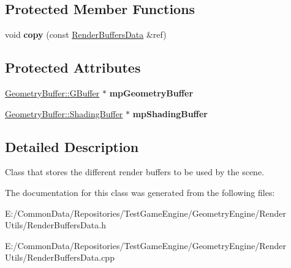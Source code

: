 \subsection*{Protected Member Functions}
\begin{DoxyCompactItemize}
\item 
\mbox{\label{class_geometry_engine_1_1_geometry_render_data_1_1_render_buffers_data_a2374fe2ef3836cf3820244132f9ddd2e}} 
void {\bfseries copy} (const \mbox{\hyperlink{class_geometry_engine_1_1_geometry_render_data_1_1_render_buffers_data}{Render\+Buffers\+Data}} \&ref)
\end{DoxyCompactItemize}
\subsection*{Protected Attributes}
\begin{DoxyCompactItemize}
\item 
\mbox{\label{class_geometry_engine_1_1_geometry_render_data_1_1_render_buffers_data_adc11f04ab04329903cd2016954812ab3}} 
\mbox{\hyperlink{class_geometry_engine_1_1_geometry_buffer_1_1_g_buffer}{Geometry\+Buffer\+::\+G\+Buffer}} $\ast$ {\bfseries mp\+Geometry\+Buffer}
\item 
\mbox{\label{class_geometry_engine_1_1_geometry_render_data_1_1_render_buffers_data_af9dd75456d15ee5f1bf3e14fd42463b9}} 
\mbox{\hyperlink{class_geometry_engine_1_1_geometry_buffer_1_1_shading_buffer}{Geometry\+Buffer\+::\+Shading\+Buffer}} $\ast$ {\bfseries mp\+Shading\+Buffer}
\end{DoxyCompactItemize}


\subsection{Detailed Description}
Class that stores the different render buffers to be used by the scene. 

The documentation for this class was generated from the following files\+:\begin{DoxyCompactItemize}
\item 
E\+:/\+Common\+Data/\+Repositories/\+Test\+Game\+Engine/\+Geometry\+Engine/\+Render Utils/Render\+Buffers\+Data.\+h\item 
E\+:/\+Common\+Data/\+Repositories/\+Test\+Game\+Engine/\+Geometry\+Engine/\+Render Utils/Render\+Buffers\+Data.\+cpp\end{DoxyCompactItemize}
